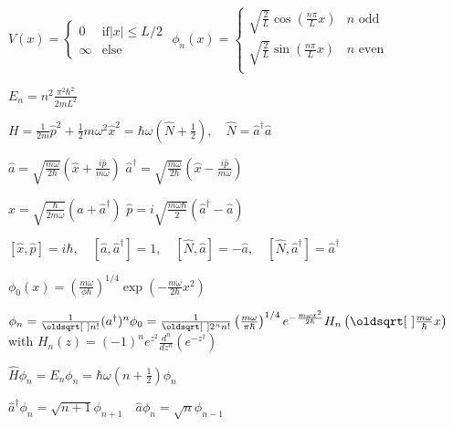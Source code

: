\columnbreak

\begin{squishlist}
    
    \item $V(x) = \begin{cases}
        0 & \text{if} |x| \leq L/2 \\ \infty & \text{else}
    \end{cases}$
    \qquad
    $\phi_n(x) = \begin{cases}
        \sqrt{\frac{2}{L}} \cos(\frac{n\pi }{L} x) & n \text{ odd} \\
        \sqrt{\frac{2}{L}} \sin(\frac{n\pi }{L} x) & n \text{ even} \\
    \end{cases}$
    
    \item $E_n = n^2 \frac{\pi^2 \hbar^2}{2 m L^2}$
\end{squishlist}

\begin{squishlist}
    \item$H = \frac{1}{2m}\hat{p}^2 + \frac{1}{2}m \omega^2 \hat{x}^2 = \hbar \omega (\hat{N} + \frac{1}{2}), \quad \hat{N} = \hat{a}^{\dagger} \hat{a}$
    \item $\hat{a} = \sqrt{\frac{m\omega}{2\hbar}} \left( \hat{x} + \frac{i \hat{p}}{m \omega}\right)$ \quad 
     $\hat{a}^{\dagger} = \sqrt{\frac{m\omega}{2\hbar}} \left( \hat{x} - \frac{i \hat{p}}{m \omega}\right)$ \quad 
    \item $\hat{x} = \sqrt{\frac{\hbar }{2 m \omega}}(\hat{a} + \hat{a}^{\dagger})$ \quad $\hat{p} = i \sqrt{\frac{m \omega \hbar}{2}} ( \hat{a}^{\dagger} - \hat{a})$
    \item $[\hat{x}, \hat{p}] = i \hbar, \quad [\hat{a}, \hat{a}^{\dagger}] = 1, \quad [\hat{N}, \hat{a}] = - \hat{a}, \quad [\hat{N},\hat{a}^\dagger] = \hat{a}^{\dagger}$
    \item $\phi_0(x) = \left( \frac{m \omega}{\phi \hbar}   \right)^{1/4} \exp \left( - \frac{m \omega }{2 \hbar} x^2\right)$
    \item $ \phi_n = \frac{1}{\sqrt{n!}}(a^{\dagger})^n \phi_0 = \frac{1}{\sqrt{2^n n!}} \left(\frac{m\omega}{\pi \hbar}\right)^{1/4} e^{-\frac{m \omega x^2}{2 \hbar}} H_n \left(\sqrt{\frac{m \omega }{\hbar}}x \right) \\ $ with $H_n(z) = (-1)^n e^{z^2} \frac{d^n}{dz^n} (e^{-z^2})$
    \item $\hat{H} \phi_n = E_n \phi_n = \hbar \omega (n + \frac{1}{2})\phi_n$
    \item $\hat{a}^{\dagger} \phi_n = \sqrt{n+1} \phi_{n+1} \quad \hat{a}\phi_n = \sqrt{n} \phi_{n-1}$
\end{squishlist}


